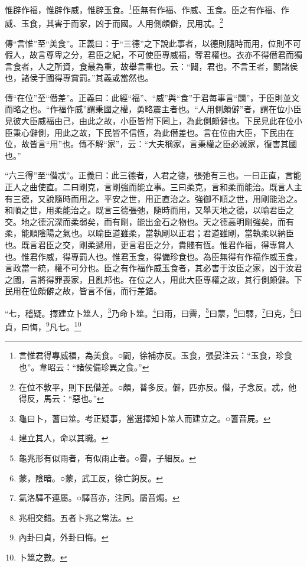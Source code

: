 惟辟作福，惟辟作威，惟辟玉食。\footnote{言惟君得專威福，為美食。○闢，徐補亦反。玉食，張晏注云：“玉食，珍食也”。韋昭云：“諸侯備珍異之食。”}臣無有作福、作威、玉食。臣之有作福、作威、玉食，其害于而家，凶于而國。人用側頗僻，民用忒。\footnote{在位不敦平，則下民僣差。○頗，普多反。僻，匹亦反。僣，子念反。忒，他得反，馬云：“惡也。”}

{\noindent\zhuan{}\fzbyks 傳“言惟”至“美食”。正義曰：于“三德”之下說此事者，以德則隨時而用，位則不可假人，故言尊卑之分，君臣之紀，不可使臣專威福，奪君權也。衣亦不得僣君而獨言食者，人之所資，食最為重，故舉言重也。云：“闢，君也。不言王者，關諸侯也，諸侯于國得專賞罰。”其義或當然也。 \par}

{\noindent\zhuan{}\fzbyks 傳“在位”至“僣差”。正義曰：此經“福”、“威”與“食”于君每事言“闢”，于臣則並文而略之也。“作福作威”謂秉國之權，勇略震主者也。“人用側頗僻”者，謂在位小臣見彼大臣威福由己，由此之故，小臣皆附下罔上，為此側頗僻也。下民見此在位小臣秉心僻側，用此之故，下民皆不信恆，為此僣差也。言在位由大臣，下民由在位，故皆言“用”也。傳不解“家”，云：“大夫稱家，言秉權之臣必滅家，復害其國也。” \par}

{\noindent\shu{}\fzkt “六三得”至“僣忒”。正義曰：此三德者，人君之德，張弛有三也。一曰正直，言能正人之曲使直。二曰剛克，言剛強而能立事。三曰柔克，言和柔而能治。既言人主有三德，又說隨時而用之。平安之世，用正直治之。強御不順之世，用剛能治之。和順之世，用柔能治之。既言三德張弛，隨時而用，又舉天地之德，以喻君臣之交。地之德沉深而柔弱矣，而有剛，能出金石之物也。天之德高明剛強矣，而有柔，能順陰陽之氣也。以喻臣道雖柔，當執剛以正君；君道雖剛，當執柔以納臣也。既言君臣之交，剛柔遞用，更言君臣之分，貴賤有恆。惟君作福，得專賞人也。惟君作威，得專罰人也。惟君玉食，得備珍食也。為臣無得有作福作威玉食，言政當一統，權不可分也。臣之有作福作威玉食者，其必害于汝臣之家，凶于汝君之國，言將得罪喪家，且亂邦也。在位之人，用此大臣專權之故，其行側頗僻。下民用在位頗僻之故，皆言不信，而行差錯。 \par}

“七，稽疑。擇建立卜筮人，\footnote{龜曰卜，蓍曰筮。考正疑事，當選擇知卜筮人而建立之。○蓍音屍。}乃命卜筮。\footnote{建立其人，命以其職。}曰雨，曰霽，\footnote{龜兆形有似雨者，有似雨止者。○霽，子細反。}曰蒙，\footnote{蒙，陰暗。○蒙，武工反，徐亡鉤反。}曰驛，\footnote{氣洛驛不連屬。○驛音亦，注同。屬音燭。}曰克，\footnote{兆相交錯。五者卜兆之常法。}曰貞，曰悔，\footnote{內卦曰貞，外卦曰悔。}凡七。\footnote{卜筮之數。}


